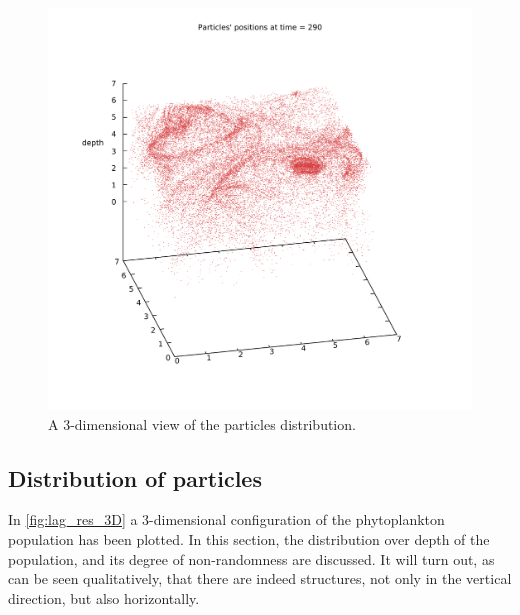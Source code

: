 
\begin{figure}[h]
        \includegraphics[width=\textwidth]{data/3D_model/run2/positions_145_1_C}
        \caption{A 3-dimensional view of the particles distribution.}
        \label{fig:lag_res_3D}
\end{figure}


\subsection{Distribution of particles} \label{sec:lag_res_distribution}


In \autoref{fig:lag_res_3D} a 3-dimensional configuration of the phytoplankton population has been plotted. In this section, the distribution over depth of the population, and its degree of non-randomness are discussed. It will turn out, as can be seen qualitatively, that there are indeed structures, not only in the vertical direction, but also horizontally.


